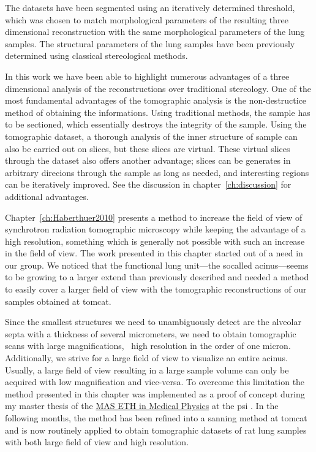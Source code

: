 The datasets have been segmented using an iteratively determined threshold, which was chosen to match morphological parameters of the resulting three dimensional reconstruction with the same morphological parameters of the lung samples. The structural parameters of the lung samples have been previously determined using classical stereological methods.

In this work we have been able to highlight numerous advantages of a three dimensional analysis of the reconstructions over traditional stereology. One of the most fundamental advantages of the tomographic analysis is the non-destructice method of obtaining the informations. Using traditional methods, the sample has to be sectioned, which essentially destroys the integrity of the sample. Using the tomographic dataset, a thorough analysis of the inner structure of sample can also be carried out on slices, but these slices are virtual. These virtual slices through the dataset also offers another advantage; slices can be generates in arbitrary direcions through the sample as long as needed, and interesting regions can be iteratively improved. See the discussion in chapter~\ref{ch:discussion} for additional advantages.

Chapter~\ref{ch:Haberthuer2010} presents a method to increase the field of view of synchrotron radiation tomographic microscopy while keeping the advantage of a high resolution, something which is generally not possible with such an increase in the field of view. The work presented in this chapter started out of a need in our group. We noticed that the functional lung unit---the socalled acinus---seems to be growing to a larger extend than previously described  and needed a method to easily cover a larger field of view with the tomographic reconstructions of our samples obtained at \ac{tomcat}.

Since the smallest structures we need to unambiguously detect are the alveolar septa with a thickness of several micrometers, we need to obtain tomographic scans with large magnifications, \ie\ high resolution in the order of one micron. Additionally, we strive for a large field of view to visualize an entire acinus. Usually, a large field of view resulting in a large sample volume can only be acquired with low magnification and vice-versa. To overcome this limitation the method presented in this chapter was implemented as a proof of concept during my master thesis of the \href{http://www.biomed.ee.ethz.ch/nds/}{MAS ETH in Medical Physics} at the \ac{psi} \cite{Haberthuer2008c}. In the following months, the method has been refined into a sanning method at \ac{tomcat} and is now routinely applied to obtain tomographic datasets of rat lung samples with both large field of view and high resolution.

